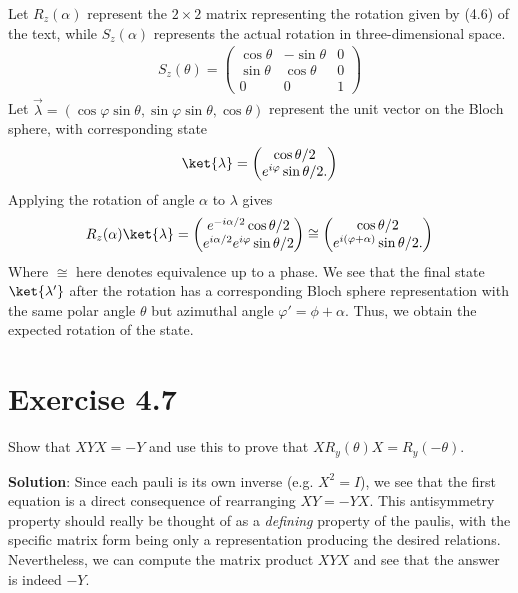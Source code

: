 \documentclass{book}
\begin{document}
    Let $R_{z}(\alpha)$ represent the $2\times 2$ matrix representing the rotation given by (4.6) of the text, while $S_z(\alpha)$ represents the actual rotation in three-dimensional space.
    \begin{align}
        S_z (\theta) = \begin{pmatrix}
            \cos\theta & -\sin\theta & 0\\
            \sin\theta & \cos\theta & 0 \\
            0 & 0 & 1
        \end{pmatrix}
    \end{align}
    Let $\vec{\lambda} = (\cos\varphi \sin\theta, \sin\varphi \sin\theta, \cos\theta)$ represent the unit vector on the Bloch sphere, with corresponding state 
    \begin{align}
        \ket{\lambda} = \begin{pmatrix}
            \cos\theta/2 \\
            e^{i\varphi}\sin\theta/2.
        \end{pmatrix}
    \end{align}
    Applying the rotation of angle $\alpha$ to $\lambda$ gives
    \begin{align}
        R_z(\alpha)\ket{\lambda} = \begin{pmatrix}
            e^{-i\alpha/2}\cos\theta/2 \\
            e^{i\alpha/2}e^{i\varphi} \sin\theta/2
        \end{pmatrix} \cong \begin{pmatrix}
            \cos\theta/2 \\
            e^{i(\varphi + \alpha)} \sin\theta/2.
        \end{pmatrix}
    \end{align}
    Where $\cong$ here denotes equivalence up to a phase. We see that the final state $\ket{\lambda'}$ after the rotation has a corresponding Bloch sphere representation with the same polar angle $\theta$ but azimuthal angle $\varphi' = \phi + \alpha$. Thus, we obtain the expected rotation of the state. 

\section*{Exercise 4.7}
    Show that $XYX = -Y$ and use this to prove that $XR_y(\theta)X = R_y(-\theta)$.
    
    \textbf{Solution}: Since each pauli is its own inverse (e.g. $X^2 = I$), we see that the first equation is a direct consequence of rearranging $XY = - YX$. This antisymmetry property should really be thought of as a \emph{defining} property of the paulis, with the specific matrix form being only a representation producing the desired relations. Nevertheless, we can compute the matrix product $XYX$ and see that the answer is indeed $-Y$.
    
\end{document}
